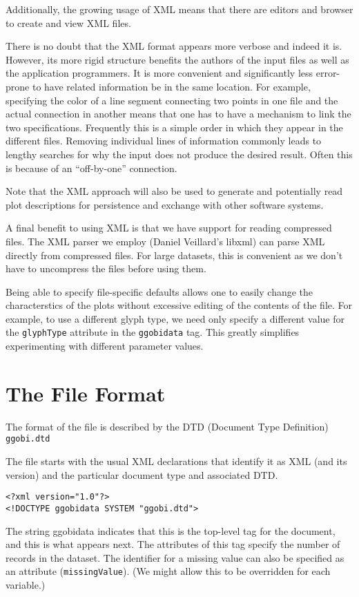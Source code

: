 \documentclass{article}
\begin{document}
Additionally, the growing usage of XML means that there are editors
and browser to create and view XML files.

There is no doubt that the XML format appears more verbose and indeed
it is. However, its more rigid structure benefits the authors of the
input files as well as the application programmers.  It is more
convenient and significantly less error-prone to have related
information be in the same location.  For example, specifying the
color of a line segment connecting two points in one file and the
actual connection in another means that one has to have a mechanism to
link the two specifications. Frequently this is a simple order in
which they appear in the different files.  Removing individual lines
of information commonly leads to lengthy searches for why the input
does not produce the desired result.  Often this is because of an
``off-by-one'' connection.


Note that the XML approach will also be used to generate and
potentially read plot descriptions for persistence and exchange with
other software systems.


A final benefit to using XML is that we have support for reading
compressed files.  The XML parser we employ (Daniel Veillard's libxml)
can parse XML directly from compressed files.  For large datasets,
this is convenient as we don't have to uncompress the files before
using them.

Being able to specify file-specific defaults allows one to easily
change the characterstics of the plots without excessive editing of
the contents of the file.  For example, to use a different glyph type,
we need only specify a different value for the \texttt{glyphType}
attribute in the \texttt{ggobidata} tag.  This greatly simplifies
experimenting with different parameter values.



\section{The File Format}
The format of the file is described by the 
DTD (Document Type Definition) 
\texttt{ggobi.dtd}

The file starts with the usual XML
declarations that identify it as XML
(and its version)
and the particular document type
and associated DTD.
\begin{verbatim}
<?xml version="1.0"?>
<!DOCTYPE ggobidata SYSTEM "ggobi.dtd">
\end{verbatim}
The string ggobidata indicates that this is the top-level tag for the
document, and this is what appears next.  The attributes of this tag
specify the number of records in the dataset.  The identifier for a
missing value can also be specified as an attribute
(\texttt{missingValue}). (We might allow this to be overridden for
each variable.)
\end{document}
